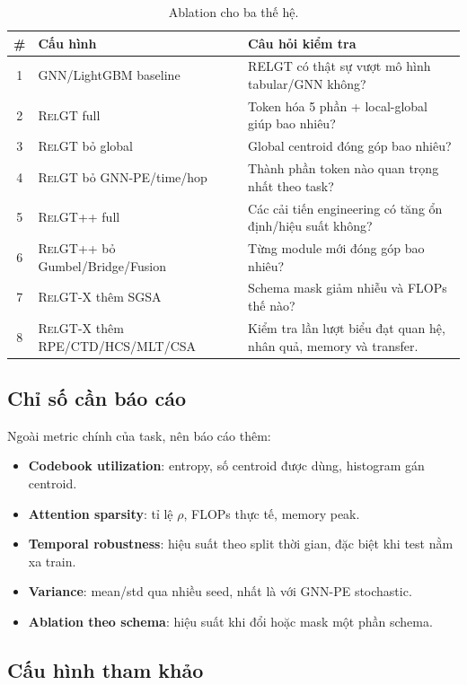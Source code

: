 \documentclass[12pt,a4paper]{article}
\newcommand{\RelGT}{\textsc{RelGT}}
\newcommand{\RelGTpp}{\textsc{RelGT++}}
\newcommand{\RelGTx}{\textsc{RelGT-X}}
\begin{document}
\begin{table}[H]
\centering
\caption{Ablation cho ba thế hệ.}
\begin{tabularx}{\textwidth}{clX}
\toprule
\textbf{\#} & \textbf{Cấu hình} & \textbf{Câu hỏi kiểm tra} \\
\midrule
1 & GNN/LightGBM baseline & RELGT có thật sự vượt mô hình tabular/GNN không? \\
2 & \RelGT{} full & Token hóa 5 phần + local-global giúp bao nhiêu? \\
3 & \RelGT{} bỏ global & Global centroid đóng góp bao nhiêu? \\
4 & \RelGT{} bỏ GNN-PE/time/hop & Thành phần token nào quan trọng nhất theo task? \\
5 & \RelGTpp{} full & Các cải tiến engineering có tăng ổn định/hiệu suất không? \\
6 & \RelGTpp{} bỏ Gumbel/Bridge/Fusion & Từng module mới đóng góp bao nhiêu? \\
7 & \RelGTx{} thêm SGSA & Schema mask giảm nhiễu và FLOPs thế nào? \\
8 & \RelGTx{} thêm RPE/CTD/HCS/MLT/CSA & Kiểm tra lần lượt biểu đạt quan hệ, nhân quả, memory và transfer. \\
\bottomrule
\end{tabularx}
\end{table}

\subsection{Chỉ số cần báo cáo}

Ngoài metric chính của task, nên báo cáo thêm:
\begin{itemize}
  \item \textbf{Codebook utilization}: entropy, số centroid được dùng, histogram
        gán centroid.
  \item \textbf{Attention sparsity}: tỉ lệ $\rho$, FLOPs thực tế, memory peak.
  \item \textbf{Temporal robustness}: hiệu suất theo split thời gian, đặc biệt
        khi test nằm xa train.
  \item \textbf{Variance}: mean/std qua nhiều seed, nhất là với GNN-PE stochastic.
  \item \textbf{Ablation theo schema}: hiệu suất khi đổi hoặc mask một phần schema.
\end{itemize}

\subsection{Cấu hình tham khảo}
\end{document}

